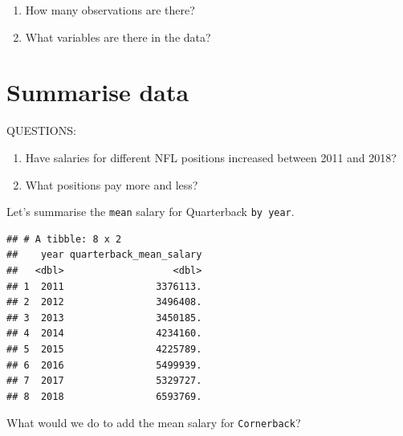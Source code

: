 \documentclass[
]{book}
\newenvironment{Shaded}{\begin{snugshade}}{\end{snugshade}}
\newcommand{\DataTypeTok}[1]{\textcolor[rgb]{0.13,0.29,0.53}{#1}}
\newcommand{\KeywordTok}[1]{\textcolor[rgb]{0.13,0.29,0.53}{\textbf{#1}}}
\newcommand{\NormalTok}[1]{#1}
\newcommand{\OperatorTok}[1]{\textcolor[rgb]{0.81,0.36,0.00}{\textbf{#1}}}
\newcommand{\OtherTok}[1]{\textcolor[rgb]{0.56,0.35,0.01}{#1}}
\newcommand{\StringTok}[1]{\textcolor[rgb]{0.31,0.60,0.02}{#1}}
\begin{document}
\begin{enumerate}
\def\labelenumi{\arabic{enumi}.}
\setcounter{enumi}{4}
\item
  How many observations are there?
\item
  What variables are there in the data?
\end{enumerate}

\hypertarget{summarise-data}{%
\section{Summarise data}\label{summarise-data}}

QUESTIONS:

\begin{enumerate}
\def\labelenumi{\arabic{enumi})}
\item
  Have salaries for different NFL positions increased between 2011 and 2018?
\item
  What positions pay more and less?
\end{enumerate}

Let's summarise the \texttt{mean} salary for Quarterback \texttt{by\ year}.

\begin{Shaded}
\end{Shaded}

\begin{verbatim}
## # A tibble: 8 x 2
##    year quarterback_mean_salary
##   <dbl>                   <dbl>
## 1  2011                3376113.
## 2  2012                3496408.
## 3  2013                3450185.
## 4  2014                4234160.
## 5  2015                4225789.
## 6  2016                5499939.
## 7  2017                5329727.
## 8  2018                6593769.
\end{verbatim}

What would we do to add the mean salary for \texttt{Cornerback}?

\begin{Shaded}
\end{Shaded}
\end{document}
